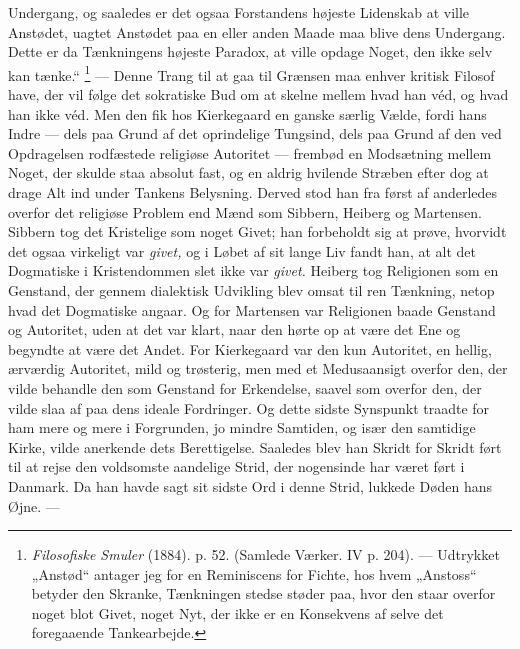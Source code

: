 \documentclass[12pt,a4paper,openany]{book}
\newcommand{\opage}[1]{\marginnote{\footnotesize\textit{[#1]}}}
\begin{document}
Undergang, og saaledes er det ogsaa Forstandens højeste Lidenskab at ville
Anstødet, uagtet Anstødet paa en eller anden Maade maa blive dens Undergang.
Dette er da Tænkningens højeste Paradox, at ville opdage Noget, den ikke selv
kan tænke.“%
\footnote[1]{\textit{Filosofiske Smuler} (1884). p. 52. (Samlede Værker. IV p.
204). --- Udtrykket „Anstød“ antager jeg for en Reminiscens for Fichte, hos
hvem „Anstoss“ betyder den Skranke, Tænkningen stedse støder paa, hvor den
staar overfor noget blot Givet, noget Nyt, der ikke er en Konsekvens af selve
det foregaaende Tankearbejde.} --- Denne Trang til at gaa til Grænsen maa
\setcounter{footnote}{0}%
\opage{150}enhver kritisk Filosof have, der vil følge det sokratiske Bud om at
skelne mellem hvad han véd, og hvad han ikke véd. Men den fik hos Kierkegaard
en ganske særlig Vælde, fordi hans Indre --- dels paa Grund af det oprindelige
Tungsind, dels paa Grund af den ved Opdragelsen rodfæstede religiøse Autoritet
--- frembød en Modsætning mellem Noget, der skulde staa absolut fast, og en
aldrig hvilende Stræben efter dog at drage Alt ind under Tankens Belysning.
Derved stod han fra først af anderledes overfor det religiøse Problem end Mænd
som Sibbern, Heiberg og Martensen. Sibbern tog det Kristelige som noget Givet;
han forbeholdt sig at prøve, hvorvidt det ogsaa virkeligt var \textit{givet,}
og i Løbet af sit lange Liv fandt han, at alt det Dogmatiske i Kristendommen
slet ikke var \textit{givet.} Heiberg tog Religionen som en Genstand, der
gennem dialektisk Udvikling blev omsat til ren Tænkning, netop hvad det
Dogmatiske angaar. Og for Martensen var Religionen baade Genstand og Autoritet,
uden at det var klart, naar den hørte op at være det Ene og begyndte at være
det Andet. For Kierkegaard var den kun Autoritet, en hellig, ærværdig
Autoritet, mild og trøsterig, men med et Medusaansigt overfor den, der vilde
behandle den som Genstand for Erkendelse, saavel som overfor den, der vilde
slaa af paa dens ideale Fordringer. Og dette sidste Synspunkt traadte for ham
mere og mere i Forgrunden, jo mindre Samtiden, og især den samtidige Kirke,
vilde anerkende dets Berettigelse. Saaledes blev han Skridt for Skridt ført til
at rejse den voldsomste aandelige Strid, der nogensinde har været ført i
Danmark. Da han havde sagt sit sidste Ord i denne Strid, lukkede Døden hans Øjne. ---
\end{document}
